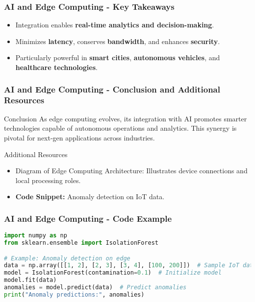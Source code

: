 \documentclass{beamer}
\begin{document}
\begin{frame}
    \frametitle{AI and Edge Computing - Key Takeaways}
    \begin{itemize}
        \item Integration enables \textbf{real-time analytics and decision-making}.
        \item Minimizes \textbf{latency}, conserves \textbf{bandwidth}, and enhances \textbf{security}.
        \item Particularly powerful in \textbf{smart cities}, \textbf{autonomous vehicles}, and \textbf{healthcare technologies}.
    \end{itemize}
\end{frame}

\begin{frame}[fragile]
    \frametitle{AI and Edge Computing - Conclusion and Additional Resources}
    \begin{block}{Conclusion}
        As edge computing evolves, its integration with AI promotes smarter technologies capable of autonomous operations and analytics. This synergy is pivotal for next-gen applications across industries.
    \end{block}
    \begin{block}{Additional Resources}
        \begin{itemize}
            \item Diagram of Edge Computing Architecture: Illustrates device connections and local processing roles.
            \item \textbf{Code Snippet:} Anomaly detection on IoT data.
        \end{itemize}
    \end{block}
\end{frame}

\begin{frame}[fragile]
    \frametitle{AI and Edge Computing - Code Example}
    \begin{lstlisting}[language=Python]
import numpy as np
from sklearn.ensemble import IsolationForest

# Example: Anomaly detection on edge
data = np.array([[1, 2], [2, 3], [3, 4], [100, 200]])  # Sample IoT data
model = IsolationForest(contamination=0.1)  # Initialize model
model.fit(data)
anomalies = model.predict(data)  # Predict anomalies
print("Anomaly predictions:", anomalies)
    \end{lstlisting}
\end{frame}
\end{document}

